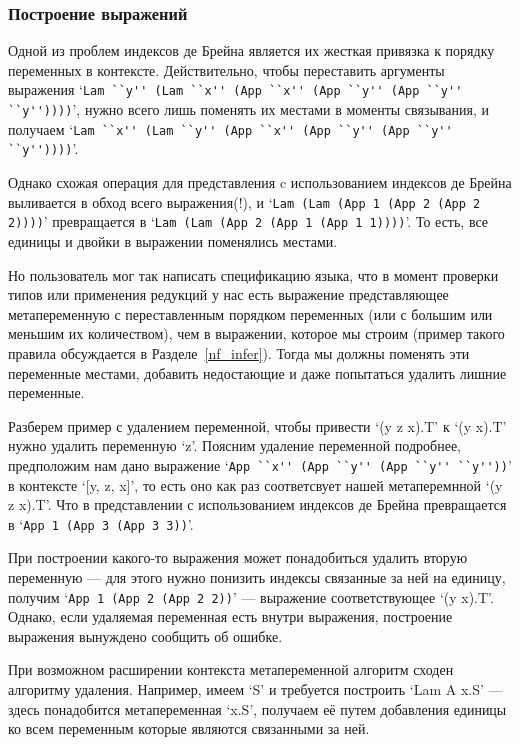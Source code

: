 \subsubsection{Построение выражений}\label{build_exp}
Одной из проблем индексов де Брейна является их жесткая привязка к порядку переменных в контексте. Действительно, чтобы переставить аргументы выражения `\lstinline{Lam ``y'' (Lam ``x'' (App ``x'' (App ``y'' (App ``y'' ``y''))))}', нужно всего лишь поменять их местами в моменты связывания, и получаем `\lstinline{Lam ``x'' (Lam ``y'' (App ``x'' (App ``y'' (App ``y'' ``y''))))}'.

Однако схожая операция для представления c использованием индексов де Брейна выливается в обход всего выражения(!), и `\lstinline{Lam (Lam (App 1 (App 2 (App 2 2))))}' превращается в `\lstinline{Lam (Lam (App 2 (App 1 (App 1 1))))}'. То есть, все единицы и двойки в выражении поменялись местами.

Но пользователь мог так написать спецификацию языка, что в момент проверки типов или применения редукций у нас есть выражение представляющее метапеременную с переставленным порядком переменных (или с большим или меньшим их количеством), чем в выражении, которое мы строим (пример такого правила обсуждается в Разделе~\ref{nf_infer}). Тогда мы должны поменять эти переменные местами, добавить недостающие и даже попытаться удалить лишние переменные.

Разберем пример с удалением переменной, чтобы привести `(y z x).T' к `(y x).T' нужно удалить переменную `z'. Поясним удаление переменной подробнее, предположим нам дано выражение `\lstinline{App ``x'' (App ``y'' (App ``y'' ``y''))}' в контексте `[y, z, x]', то есть оно как раз соответсвует нашей метаперемнной `(y z x).T'. Что в представлении с использованием индексов де Брейна превращается в `\lstinline{App 1 (App 3 (App 3 3))}'.

При построении какого-то выражения может понадобиться удалить вторую переменную --- для этого нужно понизить индексы связанные за ней на единицу, получим `\lstinline{App 1 (App 2 (App 2 2))}' --- выражение соответствующее `(y x).T'. Однако, если удаляемая переменная есть внутри выражения, построение выражения вынуждено сообщить об ошибке.

При возможном расширении контекста метапеременной алгоритм сходен алгоритму удаления. Например, имеем `S' и требуется построить `Lam A x.S' --- здесь понадобится метапеременная `x.S', получаем её путем добавления единицы ко всем переменным которые являются связанными за ней.


